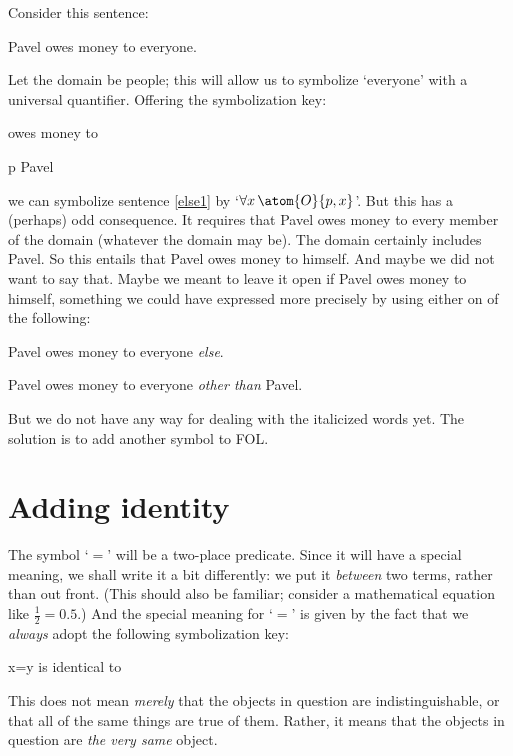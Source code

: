 Consider this sentence:
\begin{earg}
\item[\ex{else1}] Pavel owes money to everyone.
\end{earg}
Let the domain be people; this will allow us to symbolize `everyone' with a universal quantifier. Offering the symbolization key:
	\begin{ekey}
		\item[\atom{O}{x,y}]  owes money to 
		\item[p] Pavel
	\end{ekey}
we can symbolize sentence \ref{else1} by `$\forall x\, \atom{O}{p,x}$'. But this has a (perhaps) odd consequence. It requires that Pavel owes money to every member of the domain (whatever the domain may be). The domain certainly includes Pavel. So this entails that Pavel owes money to himself. And maybe we did not want to say that. Maybe we meant to leave it open if Pavel owes money to himself, something we could have expressed more precisely by using either on of the following:
	\begin{earg}
		\item[\ex{else1b}] Pavel owes money to everyone \emph{else}.
		\item[\ex{else1c}] Pavel owes money to everyone \emph{other than} Pavel.
	\end{earg}
But we do not have any way for dealing with the italicized words yet. The solution is to add another symbol to FOL.

\section{Adding identity}

The symbol `$=$' will be a two-place predicate. Since it will have a special meaning, we shall write it a bit differently: we put it \emph{between} two terms, rather than out front. (This should also be familiar; consider a mathematical equation like $\frac{1}{2} = 0.5$.) And the special meaning for `$=$' is given by the fact that we \emph{always} adopt the following symbolization key: 
	\begin{ekey}
		\item[x=y]  is identical to \gap{y}
	\end{ekey}
This does not mean \emph{merely} that the objects in question are indistinguishable, or that all of the same things are true of them. Rather, it means that the objects in question are \emph{the very same} object.

